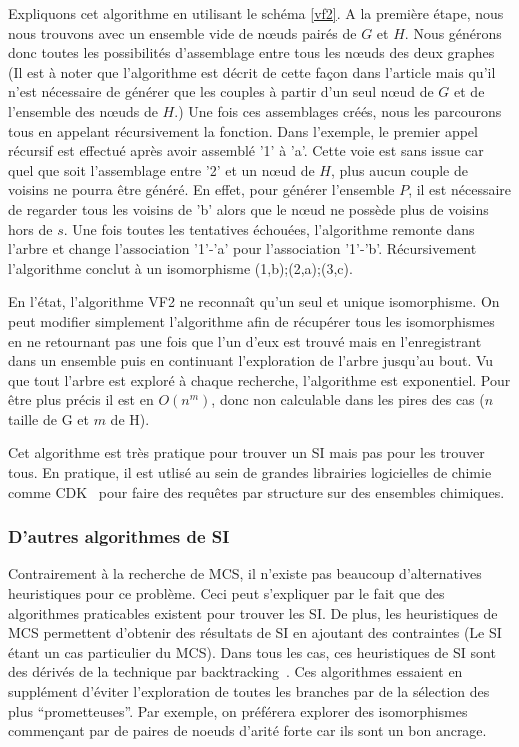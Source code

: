Expliquons cet algorithme en utilisant le schéma \ref{vf2}.
A la première étape, nous nous trouvons avec un ensemble vide de n\oe{}uds pairés de $G$ et $H$.
Nous générons donc toutes les possibilités d'assemblage entre tous les n\oe{}uds des deux graphes (Il est à noter que l'algorithme
est décrit de cette façon dans l'article mais qu'il n'est nécessaire de générer que les couples à partir d'un seul n\oe{}ud de $G$
et de l'ensemble des n\oe{}uds de $H$.)
Une fois ces assemblages créés, nous les parcourons tous en appelant récursivement la fonction.
Dans l'exemple, le premier appel récursif est effectué après avoir assemblé '1' à 'a'.
Cette voie est sans issue car quel que soit l'assemblage entre '2' et un n\oe{}ud de $H$, plus aucun couple de voisins ne pourra être
généré.
En effet, pour générer l'ensemble $P$, il est nécessaire de regarder tous les voisins de 'b' alors que le n\oe{}ud ne possède plus
de voisins hors de $s$.
Une fois toutes les tentatives échouées, l'algorithme remonte dans l'arbre et change l'association '1'-'a' pour l'association
'1'-'b'.
Récursivement l'algorithme conclut à un isomorphisme {(1,b);(2,a);(3,c)}.

En l'état, l'algorithme VF2 ne reconnaît qu'un seul et unique isomorphisme.
On peut modifier simplement l'algorithme afin de récupérer tous les isomorphismes en ne retournant pas une fois que l'un d'eux est
trouvé mais en l'enregistrant dans un ensemble puis en continuant l'exploration de l'arbre jusqu'au bout.
Vu que tout l'arbre est exploré à chaque recherche, l'algorithme est exponentiel.
Pour être plus précis il est en $O(n^m)$, donc non calculable dans les pires des cas ($n$ taille de G et $m$ de H).

Cet algorithme est très pratique pour trouver un SI mais pas pour les trouver tous.
En pratique, il est utlisé au sein de grandes librairies logicielles de chimie comme CDK~\cite{steinbeck_chemistry_2003} pour faire des requêtes par structure sur des ensembles chimiques.


\subsubsection{D'autres algorithmes de SI}

Contrairement à la recherche de MCS, il n'existe pas beaucoup d'alternatives heuristiques pour ce problème.
Ceci peut s'expliquer par le fait que des algorithmes praticables existent pour trouver les SI.
De plus, les heuristiques de MCS permettent d'obtenir des résultats de SI en ajoutant des contraintes (Le SI étant un cas particulier du MCS).
Dans tous les cas, ces heuristiques de SI sont des dérivés de la technique par backtracking~\cite{kaijar_developing_2012}.
Ces algorithmes essaient en supplément d'éviter l'exploration de toutes les branches par de la sélection des plus ``prometteuses''.
Par exemple, on préférera explorer des isomorphismes commençant par de paires de noeuds d'arité forte car ils sont un bon ancrage.

